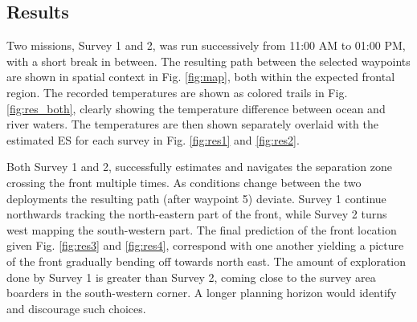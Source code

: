 \documentclass[aoas]{imsart}
\begin{document}
\subsection{Results}

Two missions, Survey 1 and 2, was run successively from 11:00 AM to 01:00 PM, with a short break in between. The resulting path between the selected waypoints are shown in spatial context in Fig. \ref{fig:map}, both within the expected frontal region. The recorded temperatures are shown as colored trails in Fig. \ref{fig:res_both}, clearly showing the temperature difference between ocean and river waters. The temperatures are then shown separately overlaid with the estimated ES for each survey in Fig. \ref{fig:res1} and \ref{fig:res2}. 

Both Survey 1 and 2, successfully estimates and navigates the separation zone crossing the front multiple times. As conditions change between the two deployments the resulting path (after waypoint 5) deviate. Survey 1 continue northwards tracking the north-eastern part of the front, while Survey 2 turns west mapping the south-western part. The final prediction of the front location given Fig. \ref{fig:res3} and \ref{fig:res4}, correspond with one another yielding a picture of the front gradually bending off towards north east. The amount of exploration done by Survey 1 is greater than Survey 2, coming close to the survey area boarders in the south-western corner. A longer planning horizon would identify and discourage such choices. 
\end{document}
